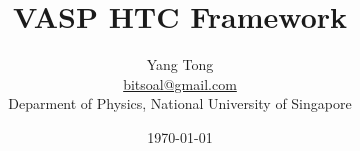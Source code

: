 \documentclass{article}
\title{VASP HTC Framework}
\author{Yang Tong \\ \href{mailto:bitsoal@gmail.com}{bitsoal@gmail.com} \\ Deparment of Physics, National University of Singapore}
\date{\today}
\begin{document}
\begin{titlepage}
\maketitle
\end{titlepage}
\end{document}
